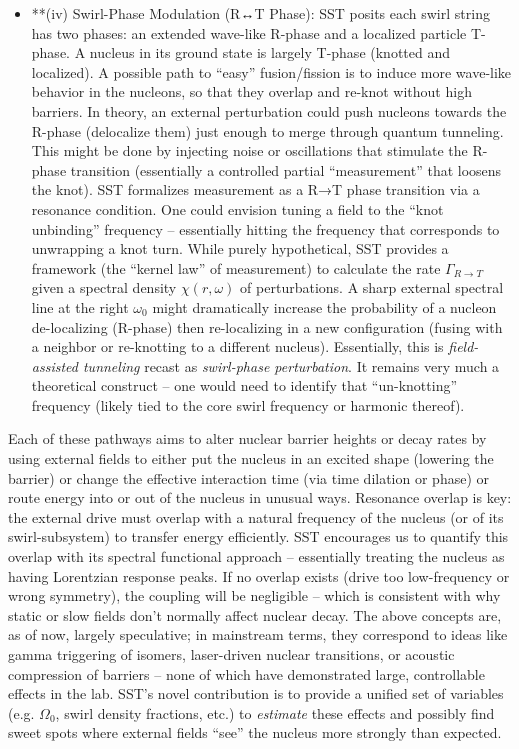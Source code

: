 \documentclass[11pt]{article}
\begin{document}
\begin{itemize}
\item 
**(iv) Swirl-Phase Modulation (R↔T Phase): SST posits each swirl string has two phases: an extended wave-like R-phase and a localized particle T-phase. A nucleus in its ground state is largely T-phase (knotted and localized). A possible path to “easy” fusion/fission is to induce more wave-like behavior in the nucleons, so that they overlap and re-knot without high barriers. In theory, an external perturbation could push nucleons towards the R-phase (delocalize them) just enough to merge through quantum tunneling. This might be done by injecting noise or oscillations that stimulate the R-phase transition (essentially a controlled partial “measurement” that loosens the knot). SST formalizes measurement as a R→T phase transition via a resonance condition. One could envision tuning a field to the “knot unbinding” frequency – essentially hitting the frequency that corresponds to unwrapping a knot turn. While purely hypothetical, SST provides a framework (the “kernel law” of measurement) to calculate the rate $\Gamma_{R\to T}$ given a spectral density $\chi(r,\omega)$ of perturbations. A sharp external spectral line at the right $\omega_0$ might dramatically increase the probability of a nucleon de-localizing (R-phase) then re-localizing in a new configuration (fusing with a neighbor or re-knotting to a different nucleus). Essentially, this is \textit{field-assisted tunneling} recast as \textit{swirl-phase perturbation}. It remains very much a theoretical construct – one would need to identify that “un-knotting” frequency (likely tied to the core swirl frequency or harmonic thereof).




\end{itemize}

Each of these pathways aims to alter nuclear barrier heights or decay rates by using external fields to either put the nucleus in an excited shape (lowering the barrier) or change the effective interaction time (via time dilation or phase) or route energy into or out of the nucleus in unusual ways. Resonance overlap is key: the external drive must overlap with a natural frequency of the nucleus (or of its swirl-subsystem) to transfer energy efficiently. SST encourages us to quantify this overlap with its spectral functional approach – essentially treating the nucleus as having Lorentzian response peaks. If no overlap exists (drive too low-frequency or wrong symmetry), the coupling will be negligible – which is consistent with why static or slow fields don’t normally affect nuclear decay. The above concepts are, as of now, largely speculative; in mainstream terms, they correspond to ideas like gamma triggering of isomers, laser-driven nuclear transitions, or acoustic compression of barriers – none of which have demonstrated large, controllable effects in the lab. SST’s novel contribution is to provide a unified set of variables (e.g. $\Omega_0$, swirl density fractions, etc.) to \textit{estimate} these effects and possibly find sweet spots where external fields “see” the nucleus more strongly than expected.
\end{document}
